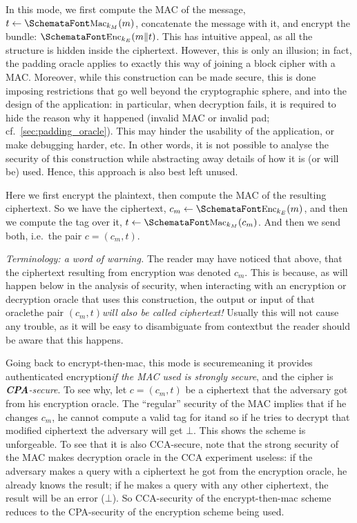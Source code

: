   \smallskip

   In this mode, we first compute the MAC of the message, $t \leftarrow\myemph{Mac}_{k_M}(m)$, concatenate the message with it, and encrypt the bundle: $\myemph{Enc}_{k_E}(m\|t)$. This has intuitive appeal, as all the structure is hidden inside the ciphertext. However, this is only an illusion; in fact, the padding oracle applies to exactly this way of joining a block cipher with a MAC. Moreover, while this construction can be made secure, this is done imposing restrictions that go well beyond the cryptographic sphere, and into the design of the application: in particular, when decryption fails, it is required to hide the reason why it happened (invalid MAC or invalid pad; cf.~\ts\ref{sec:padding_oracle}). This may hinder the usability of the application, or make debugging harder, etc. In other words, it is not possible to analyse the security of this construction while abstracting away details of how it is (or will be) used. Hence, this approach is also best left unused.

  \smallskip

   Here we first encrypt the plaintext, then compute the MAC of the resulting ciphertext. So we have the ciphertext, $c_m \leftarrow\myemph{Enc}_{k_E}(m)$, and then we compute the tag over it, $t \leftarrow\myemph{Mac}_{k_M}(c_m)$. And then we send both, i.e.\ the pair $c = (c_m, t)$.

  \textit{Terminology: a word of warning.} The reader may have noticed that above, that the ciphertext resulting from encryption was denoted $c_m$. This is because, as will happen below in the analysis of security, when interacting with an encryption or decryption oracle that uses this construction, the output or input of that oracle\emd the pair $(c_m, t)$\emd \emph{will also be called ciphertext!} Usually this will not cause any trouble, as it will be easy to disambiguate from context\emd but the reader should be aware that this happens.

  Going back to encrypt-then-mac, this mode is secure\emd meaning it provides authenticated encryption\emd \emph{if the MAC used is strongly secure}, and the cipher is \emph{\textbf{CPA}-secure}. To see why, let $c = (c_m, t)$ be a ciphertext that the adversary got from his encryption oracle. The ``regular'' security of the MAC implies that if he changes $c_m$, he cannot compute a valid tag for it\emd and so if he tries to decrypt that modified ciphertext the adversary will get $\bot$. This shows the scheme is unforgeable. To see that it is also CCA-secure, note that the strong security of the MAC makes decryption oracle in the CCA experiment useless: if the adversary makes a query with a ciphertext he got from the encryption oracle, he already knows the result; if he makes a query with any other ciphertext, the result will be an error ($\bot$). So CCA-security of the encrypt-then-mac scheme reduces to the CPA-security of the encryption scheme being used.

